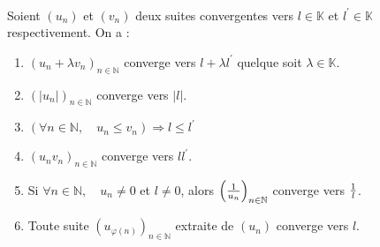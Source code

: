    \begin{theorem}
        \ \\
        \label{theorem:ops_suites_convergentes}
        Soient \((u_n)\) et \((v_n)\) deux suites convergentes vers \(l\in\mathbb{K}\) et \(l^{\prime}\in\mathbb{K}\) respectivement. On a :
        \begin{enumerate}[label=(\roman*)]
            \item \((u_n + \lambda v_n)_{n\in\mathbb{N}}\) converge vers \(l + \lambda l^{\prime}\) quelque soit \(\lambda\in\mathbb{K}\). 
            \item \((|u_n|)_{n\in\mathbb{N}}\) converge vers \(|l|\).
            \item \((\forall n \in \mathbb{N}, \quad u_n \le v_n) \Rightarrow l \le l^{\prime}\)
            \item \((u_nv_n)_{n\in\mathbb{N}}\) converge vers \(ll^{\prime}\).
            \item Si \(\forall n \in \mathbb{N}, \quad u_n \neq 0\) et \(l\neq 0\), alors \({\left({1\over u_n}\right)}_{n\in\mathbb{N}}\) converge vers \({1\over l}\).
            \item Toute suite \((u_{\varphi(n)})_{n\in\mathbb{N}}\) extraite de \((u_n)\) converge vers \(l\). 
        \end{enumerate}
    \end{theorem}

